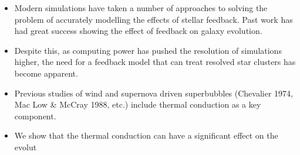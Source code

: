 \documentclass{report}
\begin{document}
\fontsize{30pt}{1em}\selectfont
\color{white}
\begin{itemize}
\item Modern simulations have taken a number of approaches to solving the problem of
accurately modelling the effects of stellar feedback. Past work has had great
success showing the effect of feedback on galaxy evolution.  
\item Despite this, as computing power has pushed the resolution of simulations 
higher, the need for a feedback model that can treat resolved star clusters has 
become apparent.
\item Previous studies of wind and supernova driven superbubbles (Chevalier 1974, Mac Low
\& McCray 1988, etc.) include thermal conduction as a key component.
\item We show that the thermal conduction can have a significant effect on the
evolut
\end{itemize}
\end{document}
